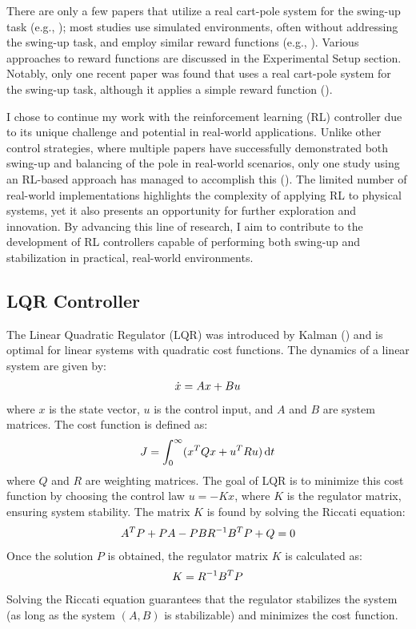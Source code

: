 There are only a few papers that utilize a real cart-pole system for the swing-up task (e.g., \cite{nayante_reinforcement_2021, pilcolearner_cart-pole_2011, deisenroth_pilco_2011}); most studies use simulated environments, often without addressing the swing-up task, and employ similar reward functions (e.g., \cite{kumar_balancing_2020, liu_swing-up_2023, kimura_stochastic_1999}). Various approaches to reward functions are discussed in the Experimental Setup section. Notably, only one recent paper was found that uses a real cart-pole system for the swing-up task, although it applies a simple reward function (\cite{nayante_reinforcement_2021}).

I chose to continue my work with the reinforcement learning (RL) controller due to its unique challenge and potential in real-world applications. Unlike other control strategies, where multiple papers have successfully demonstrated both swing-up and balancing of the pole in real-world scenarios, only one study using an RL-based approach has managed to accomplish this (\cite{nayante_reinforcement_2021}). The limited number of real-world implementations highlights the complexity of applying RL to physical systems, yet it also presents an opportunity for further exploration and innovation. By advancing this line of research, I aim to contribute to the development of RL controllers capable of performing both swing-up and stabilization in practical, real-world environments.

\subsection{LQR Controller}

The Linear Quadratic Regulator (LQR) was introduced by Kalman (\citeyear{kalman_contributions_1960}) and is optimal for linear systems with quadratic cost functions. The dynamics of a linear system are given by:
\begin{align}
    \dot{x} = Ax + Bu \notag
\end{align}
where $x$ is the state vector, $u$ is the control input, and $A$ and $B$ are system matrices. The cost function is defined as:
\begin{align}
    J = \int_0^\infty (x^T Q x + u^T R u) \,\mathrm{d}t \notag
\end{align}
where $Q$ and $R$ are weighting matrices. The goal of LQR is to minimize this cost function by choosing the control law $u = -Kx$, where $K$ is the regulator matrix, ensuring system stability. The matrix $K$ is found by solving the Riccati equation:
\begin{align}
    A^T P + PA - PBR^{-1}B^T P + Q = 0 \notag
\end{align}
Once the solution $P$ is obtained, the regulator matrix $K$ is calculated as:
\begin{align}
    K = R^{-1}B^T P \notag
\end{align}
Solving the Riccati equation guarantees that the regulator stabilizes the system (as long as the system $(A, B)$ is stabilizable) and minimizes the cost function.

